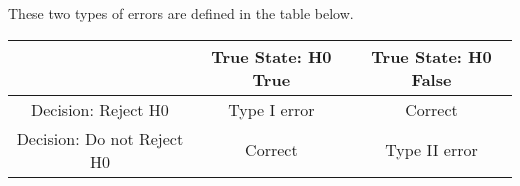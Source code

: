 \begin{frame}
These two types of errors are defined in the table below.

\begin{center}
\begin{tabular}{|c|c|c|}
\hline
&True State: H0 True	& True State: H0 False\\\hline
Decision: Reject H0	& Type I error&	Correct\\
Decision: Do not Reject H0	& Correct 	&Type II error\\ \hline
\end{tabular}
\end{center}

\end{frame}


